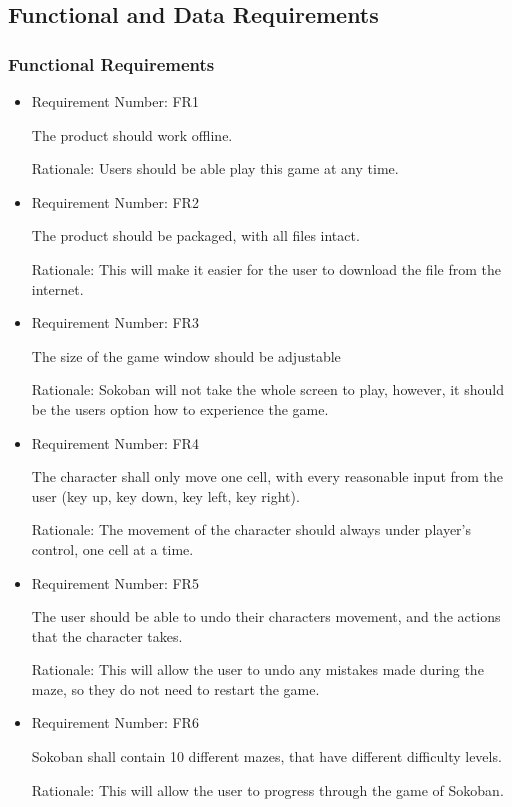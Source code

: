 \documentclass[12pt, titlepage]{article}
\begin{document}
\subsection{Functional and Data Requirements}

\subsubsection{Functional Requirements}

\begin{itemize}
\item Requirement Number: FR1 

The product should work offline. 

Rationale: Users should be able play this game at any time.

\item Requirement Number: FR2

The product should be packaged, with all files intact.

Rationale: This will make it easier for the user to download the file from the internet.

\item Requirement Number: FR3

The size of the game window should be adjustable

Rationale: Sokoban will not take the whole screen to play, however, it should be the users option how to experience the game.

\item Requirement Number: FR4

The character shall only move one cell, with every reasonable input from the user (key up, key down, key left, key right).

Rationale: The movement of the character should always under player's control, one cell at a time.

\item Requirement Number: FR5

The user should be able to undo their characters movement, and the actions that the character takes.

Rationale: This will allow the user to undo any mistakes made during the maze, so they do not need to restart the game.

\item Requirement Number: FR6

Sokoban shall contain 10 different mazes, that have different difficulty levels.

Rationale: This will allow the user to progress through the game of Sokoban.


\end{itemize}
\end{document}
